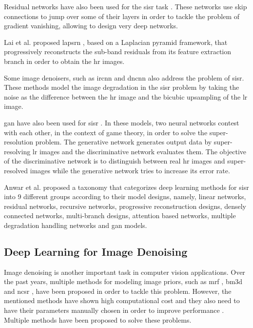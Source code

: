 Residual networks have also been used for the \gls{sisr} task \cite{EDSR}\cite{REDNET}. These networks use skip connections to jump over some of their layers in order to tackle the problem of gradient vanishing, allowing to design very deep networks.

Lai et al. proposed \gls{lapsrn} \cite{LAPSRN}\cite{LAPSRN2}, based on a Laplacian pyramid framework, that progressively reconstructs the sub-band residuals from its feature extraction branch in order to obtain the \gls{hr} images. 

Some image denoisers, such as \gls{ircnn} \cite{IRCNN} and \gls{dncnn} \cite{DNCNN} also address the problem of \gls{sisr}. These methods model the image degradation in the \gls{sisr} problem by taking the noise as the difference between the \gls{hr} image and the bicubic upsampling of the \gls{lr} image.
 
\gls{gan} have also been used for \gls{sisr} \cite{SRGAN}. In these models, two neural networks contest with each other, in the context of game theory, in order to solve the super-resolution problem. The generative network generates output data by super-resolving \gls{lr} images and the discriminative network evaluates them. The objective of the discriminative network is to distinguish between real \gls{hr} images and super-resolved images while the generative network tries to increase its error rate.

Anwar et al. \cite{DBLP:SISR} proposed a taxonomy that categorizes deep learning methods for \gls{sisr} into 9 different groups according to their model designs, namely, linear networks, residual networks, recursive networks, progressive reconstruction designs, densely connected networks, multi-branch designs, attention based networks, multiple degradation handling networks and \gls{gan} models.

\subsection{Deep Learning for Image Denoising}
Image denoising is another important task in computer vision applications. Over the past years, multiple methods for modeling image priors, such as \gls{mrf} \cite{MRF}, \gls{bm3d} \cite{BM3D} and \gls{ncsr} \cite{NCSR}, have been proposed in order to tackle this problem. However, the mentioned methods have shown high computational cost and they also need to have their parameters manually chosen in order to improve performance \cite{DBLP:DEEPNR}. Multiple methods have been proposed to solve these problems. 

